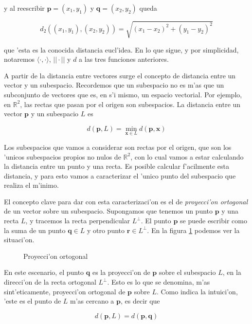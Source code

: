 \noindent
y al reescribir $\mathbf{p} = (x_1, y_1)$ y $\mathbf{q} = (x_2, y_2)$ queda

\[d_2((x_1, y_1), (x_2, y_2)) = \sqrt{(x_1 - x_2)^2 + (y_1 - y_2)^2}\]

\noindent
que 'esta es la conocida distancia eucl'idea. En lo que sigue, y por simplicidad, notaremos $\langle \cdot, \cdot \rangle$, $||\cdot||$ y $d$ a las tres funciones anteriores.

A partir de la distancia entre vectores surge el concepto de distancia entre un vector y un subespacio. Recordemos que un subespacio no es m'as que un subconjunto de vectores que es, en s'i mismo, un espacio vectorial. Por ejemplo, en $\mathbb{R}^2$, las rectas que pasan por el origen son subespacios. La distancia entre un vector $\mathbf{p}$ y un subespacio $L$ es

\[d(\mathbf{p}, L) = \min\limits_{\mathbf{x} \in L} d(\mathbf{p}, \mathbf{x})\]

\noindent
Los subespacios que vamos a considerar son rectas por el origen, que son los 'unicos subespacios propios no nulos de $\mathbb{R}^2$, con lo cual vamos a estar calculando la distancia entre un punto y una recta. Es posible calcular f'acilmente esta distancia, y para esto vamos a caracterizar el 'unico punto del subespacio que realiza el m'inimo.

El concepto clave para dar con esta caracterizaci'on es el de \textit{proyecci'on ortogonal} de un vector sobre un subespacio. Supongamos que tenemos un punto $\mathbf{p}$ y una recta $L$, y tracemos la recta perpendicular $L^{\perp}$. El punto $\mathbf{p}$ se puede escribir como la suma de un punto $\mathbf{q} \in L$ y otro punto $\mathbf{r} \in L^{\perp}$. En la figura \ref{fig3} podemos ver la situaci'on.

\begin{figure}[H]
	\begin{center}
		
	\end{center}		
	\caption{Proyecci'on ortogonal}
	\label{fig3}
\end{figure}

\noindent
En este escenario, el punto $\mathbf{q}$ es la proyecci'on de $\mathbf{p}$ sobre el subespacio $L$, en la direcci'on de la recta ortogonal $L^{\perp}$. Esto es lo que se denomina, m'as sint'eticamente, proyecci'on ortogonal de $\mathbf{p}$ sobre $L$. Como indica la intuici'on, 'este es el punto de $L$ m'as cercano a $\mathbf{p}$, es decir que

\begin{equation*}
d(\mathbf{p}, L) = d(\mathbf{p}, \mathbf{q})
\label{eq_dist_1}
\end{equation*}

